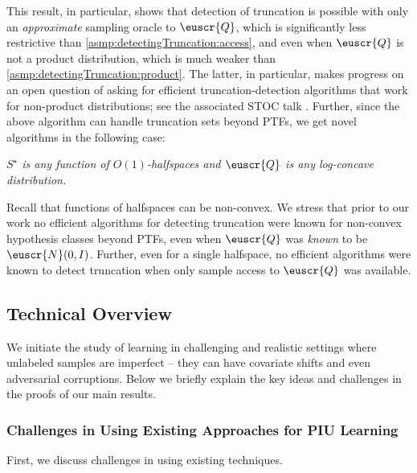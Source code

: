 \documentclass[11pt]{article}
\theoremstyle{plain}
\theoremstyle{definition}
\theoremstyle{remark}
\newcommand{\customcal}[1]{\euscr{#1}}
\newcommand{\cN}{\customcal{N}}
\newcommand{\cQ}{\customcal{Q}}
\begin{document}
        This result, in particular, shows that detection of truncation is possible with only an \textit{approximate} sampling oracle to $\cQ$, which is significantly less restrictive than \cref{asmp:detectingTruncation:access}, and even when $\cQ$ is not a product distribution, which is much weaker than \cref{asmp:detectingTruncation:product}.
        The latter, in particular, makes progress on an open question of \cite{de2024detecting} asking for efficient truncation-detection algorithms that work for non-product distributions; see the associated STOC talk \cite{de2024detectingFOCStalk}.
        Further, since the above algorithm can handle truncation sets beyond PTFs, we get novel algorithms in the following case:
        \begin{center}
            \textit{$S^\star$ is any function of $O(1)$-halfspaces and $\cQ$ is \textit{any} log-concave distribution.}
            
        \end{center}
        Recall that functions of halfspaces can be non-convex.
        We stress that prior to our work no efficient algorithms for detecting truncation were known for non-convex hypothesis classes beyond PTFs, even when $\cQ$ was \textit{known} to be $\cN(0, I)$.
        Further, even for a single halfspace, no efficient algorithms were known to detect truncation when only sample access to $\cQ$ was available.

\subsection{Technical Overview}\label{sec:technicalOverview}
We initiate the study of learning in challenging and realistic settings where unlabeled samples are imperfect -- they can have covariate shifts and even adversarial corruptions.
Below we briefly explain the key ideas and challenges in the proofs of our main results. %


    \subsubsection{Challenges in Using Existing Approaches for PIU Learning}
        \label{sec:intro:technicalOverview:challenges}
        First, we discuss challenges in using existing techniques.
\end{document}
